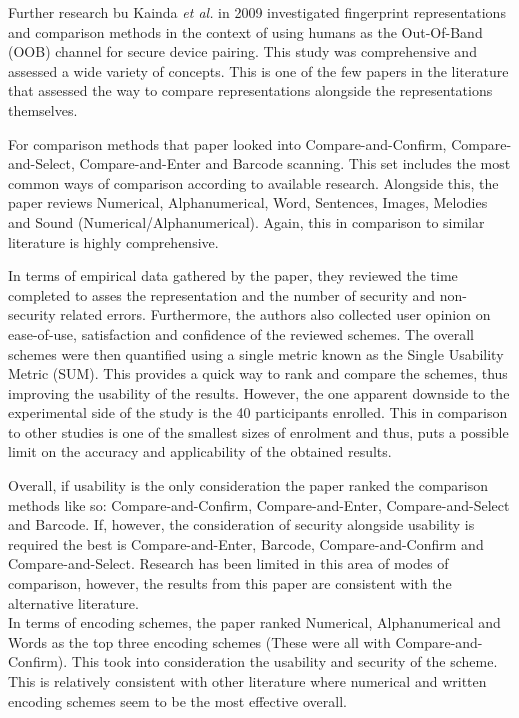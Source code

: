 Further research bu Kainda \textit{et al.}\cite{kainda2009usability} in 2009 investigated fingerprint representations and comparison methods in the context of using humans as the Out-Of-Band (OOB) channel for secure device pairing. This study was comprehensive and assessed a wide variety of concepts. This is one of the few papers in the literature that assessed the way to compare representations alongside the representations themselves.

For comparison methods that paper looked into Compare-and-Confirm, Compare-and-Select, Compare-and-Enter and Barcode scanning. This set includes the most common ways of comparison according to available research. Alongside this, the paper reviews Numerical, Alphanumerical, Word, Sentences, Images, Melodies and Sound (Numerical/Alphanumerical). Again, this in comparison to similar literature is highly comprehensive.

In terms of empirical data gathered by the paper, they reviewed the time completed to asses the representation and the number of security and non-security related errors. Furthermore, the authors also collected user opinion on ease-of-use, satisfaction and confidence of the reviewed schemes. The overall schemes were then quantified using a single metric known as the Single Usability Metric (SUM)\cite{sauro2005method}. This provides a quick way to rank and compare the schemes, thus improving the usability of the results. 
However, the one apparent downside to the experimental side of the study is the 40 participants enrolled. This in comparison to other studies is one of the smallest sizes of enrolment and thus, puts a possible limit on the accuracy and applicability of the obtained results. 

Overall, if usability is the only consideration the paper ranked the comparison methods like so: Compare-and-Confirm, Compare-and-Enter, Compare-and-Select and Barcode. If, however, the consideration of security alongside usability is required the best is Compare-and-Enter, Barcode, Compare-and-Confirm and Compare-and-Select. Research has been limited in this area of modes of comparison, however, the results from this paper are consistent with the alternative literature.
\\
In terms of encoding schemes, the paper ranked Numerical, Alphanumerical and Words as the top three encoding schemes (These were all with Compare-and-Confirm). This took into consideration the usability and security of the scheme. This is relatively consistent with other literature where numerical and written encoding schemes seem to be the most effective overall.

